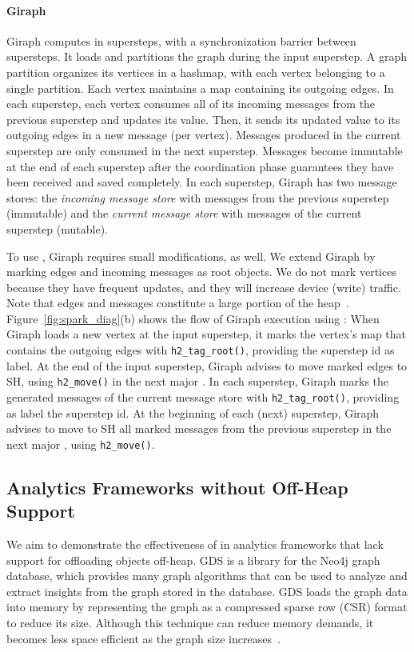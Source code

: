 \paragraph{\textbf{Giraph}}
Giraph computes in supersteps, with a synchronization barrier between
supersteps. It loads and partitions the graph during the input
superstep.  A graph partition organizes its vertices in a hashmap,
with each vertex belonging to a single partition. Each vertex
maintains a map containing its outgoing edges. In each superstep, each
vertex consumes all of its incoming messages from the previous
superstep and updates its value.  Then, it sends its updated value to
its outgoing edges in a new message (per vertex). Messages produced in
the current superstep are only consumed in the next superstep.
Messages become immutable at the end of each superstep after the
coordination phase guarantees they have been received and saved
completely.  In each superstep, Giraph has two message stores: the
\emph{incoming message store} with messages from the previous
superstep (immutable) and the \emph{current message store} with
messages of the current superstep (mutable).

To use \teraheapName, Giraph requires small modifications, as well. We extend
Giraph by marking edges and incoming messages as root objects. We do
not mark vertices because they have frequent updates, and they will
increase device (write) traffic. Note that edges and messages
constitute a large portion of the heap~\cite{giraph}.
Figure~\ref{fig:spark_diag}(b) shows the  flow of Giraph execution using
\teraheapName{}:
%
 When Giraph loads a new vertex at the input superstep, it
marks the vertex's map that contains the outgoing edges with
\texttt{h2\_tag\_root()}, providing the superstep id as label.
%
 At the end of the input superstep, Giraph advises \teraheapName{}
to move marked edges to SH, using \texttt{h2\_move()} in the next major
\teraheapGC.
%
 In each superstep, Giraph marks the generated messages of
the  current message store with \texttt{h2\_tag\_root()}, providing as
label the superstep id.
%
 At the beginning of each (next) superstep, Giraph advises
\teraheapName{} to move to SH all marked messages from the previous superstep
in the next major \teraheapGC, using \texttt{h2\_move()}.

\subsection{Analytics Frameworks without Off-Heap Support}
We aim to demonstrate the effectiveness of \teraheapName{} in analytics frameworks that
lack support for offloading objects off-heap. GDS is a library for the Neo4j
graph database, which provides many graph algorithms that can be used to analyze
and extract insights from the graph stored in the database. GDS loads the graph
data into memory by representing the graph as a compressed sparse row (CSR)
format to reduce its size. Although this technique can reduce memory demands, it
becomes less space efficient as the graph size increases~\cite{neo4j:ssd}.

